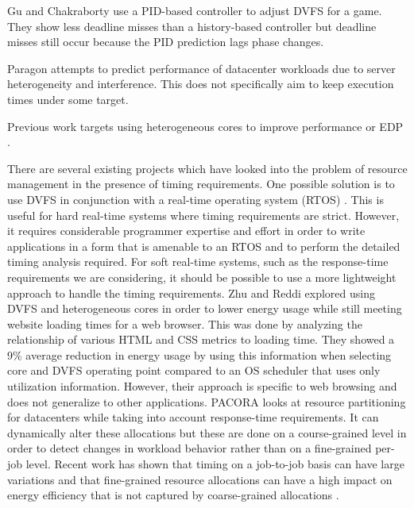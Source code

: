 Gu and Chakraborty \cite{gu-dac08} use a PID-based controller to adjust DVFS
for a game. They show less deadline misses than a history-based controller but
deadline misses still occur because the PID prediction lags phase changes.

Paragon \cite{paragon-asplos13} attempts to predict performance of datacenter
workloads due to server heterogeneity and interference. This does not
specifically aim to keep execution times under some target.

Previous work targets using heterogeneous cores to improve performance
\cite{paragon-asplos13, pie-isca12, heteroscouts-sigmetrics11} or EDP \cite{chen-dac09}.

There are several existing projects which have looked into the problem of
resource management in the presence of timing requirements. One possible
solution is to use DVFS in conjunction with a real-time operating system (RTOS)
\cite{rtdvfs-systor12}. This is useful for hard real-time systems where timing
requirements are strict. However, it requires considerable programmer expertise
and effort in order to write applications in a form that is amenable to an RTOS
and to perform the detailed timing analysis required. For soft real-time
systems, such as the response-time requirements we are considering, it should
be possible to use a more lightweight approach to handle the timing
requirements. Zhu and Reddi \cite{zhu-hpca13} explored using DVFS and
heterogeneous cores in order to lower energy usage while still meeting website
loading times for a web browser. This was done by analyzing the relationship of
various HTML and CSS metrics to loading time. They showed a 9\% average
reduction in energy usage by using this information when selecting core and
DVFS operating point compared to an OS scheduler that uses only utilization
information.  However, their approach is specific to web browsing and does not
generalize to other applications. PACORA \cite{pacora-hotpar11} looks at
resource partitioning for datacenters while taking into account response-time
requirements. It can dynamically alter these allocations but these are done on
a course-grained level in order to detect changes in workload behavior rather
than on a fine-grained per-job level. Recent work has shown that timing on a
job-to-job basis can have large variations \cite{atlas-rtas13} and that
fine-grained resource allocations can have a high impact on energy efficiency
that is not captured by coarse-grained allocations \cite{padmanabha-micro13}.

